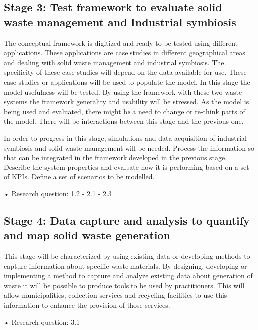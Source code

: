\subsection{Stage 3: Test framework to evaluate solid waste management and Industrial symbiosis}
The conceptual framework is digitized and ready to be tested using different applications. These applications are case studies in different geographical areas and dealing with solid waste management and industrial symbiosis. The specificity of these case studies will depend on the data available for use. These case studies or applications will be used to populate the model. In this stage the model usefulness will be tested. By using the framework with these two waste systems the framework generality and usability will be stressed. As the model is being used and evaluated, there might be a need to change or re-think parts of the model. There will be interactions between this stage and the previous one.  \par
In order to progress in this stage, simulations and data acquisition of industrial symbiosis and solid waste management will be needed. Process the information so that can be integrated in the framework developed in the previous stage. Describe the system properties and evaluate how it is performing based on a set of KPIs. Define a set of scenarios to be modelled. \par
•	Research question: 1.2 - 2.1 - 2.3           \par

\subsection{Stage 4: Data capture and analysis to quantify and map solid waste generation}
This stage will be characterized by using existing data or developing methods to capture information about specific waste materials. By designing, developing or implementing a method to capture and analyze existing data about generation of waste it will be possible to produce tools to be used by practitioners. This will allow municipalities, collection services and recycling facilities to use this information to enhance the provision of those services.      \par
•	Research question: 3.1           \par



